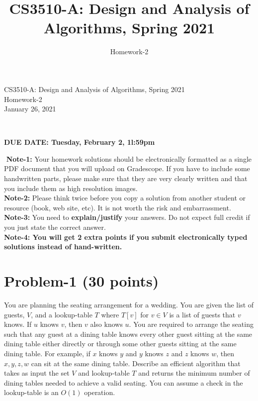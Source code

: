 \documentclass[11pt]{article}
\title{CS3510-A: Design and Analysis of Algorithms, Spring 2021}
\author{Homework-2}
\begin{document}
\begin{center}
    
    \LARGE CS3510-A: Design and Analysis of Algorithms, Spring 2021 \\ \vspace{1em} 
    \large Homework-2 \\ \vspace{0.5em}
    January 26, 2021
\end{center}
\thispagestyle{empty}
\pagestyle{empty}
​
\noindent
\begin{center}
{\bf DUE DATE: Tuesday, February 2, 1l:59pm}
\end{center}
​
\noindent
{\bf Note-1:} Your homework solutions should be electronically formatted as a single PDF document that you will upload on Gradescope. 
If you have to include some handwritten parts, please make sure that they are very clearly written and that you include them as high resolution images. \\
​
\noindent
{\bf Note-2:} Please think twice before you copy a solution from another student or resource (book, web site, etc). 
It is not worth the risk and embarrassment. \\
​
\noindent
{\bf Note-3:} You need to {\bf explain/justify} your answers. Do not expect full credit if you just state the correct answer. \\
​
\noindent
{\bf Note-4: You will get 2 extra points if you submit electronically typed solutions instead of hand-written.} 
​
\newpage
\section*{Problem-1 (30 points)}
You are planning the seating arrangement for a wedding. You are given the list of guests, $V$, and a lookup-table $T$ where $T[v]$ for $v\in V$ is a list of guests that $v$ knows. If $u$ knows $v$, then $v$ also knows $u$. You are required to arrange the seating such that any guest at a dining table knows every other guest sitting at the same dining table either directly or through some other guests sitting at the same dining table. For example, if $x$ knows $y$ and $y$ knows $z$ and $z$ knows $w$, then $x, y, z, w$ can sit at the same dining table. Describe an efficient algorithm that takes as input the set $V$ and lookup-table $T$ and returns the minimum number of dining tables needed to achieve a valid seating. You can assume a check in the lookup-table is an $O(1)$ operation. \\
\end{document}
